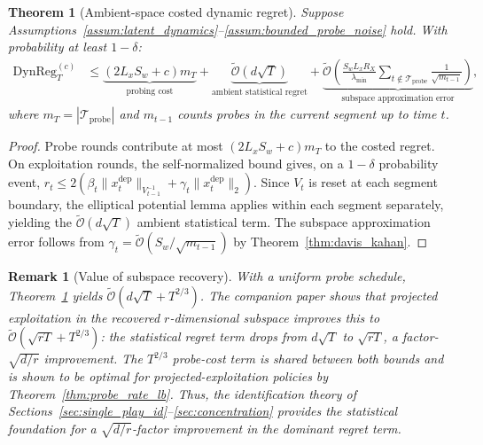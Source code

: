 \documentclass[12pt]{article}
\newcommand{\cTprobe}{\mathcal{T}_{\mathrm{probe}}}
\newcommand{\tilO}{\widetilde{\mathcal{O}}}
\newcommand{\DynReg}{\mathrm{DynReg}}
\newtheorem{theorem}{Theorem}
\newtheorem{remark}{Remark}
\theoremstyle{plain}
\theoremstyle{definition}
\begin{document}
\begin{theorem}[Ambient-space costed dynamic regret]
\label{thm:ambient_regret}
Suppose Assumptions~\ref{assum:latent_dynamics}--\ref{assum:bounded_probe_noise} hold. With probability at least $1 - \delta$:
\begin{align*}
\DynReg_T^{(c)} &\le \underbrace{(2L_x S_w + c) m_T}_{\text{probing cost}}
+ \underbrace{\tilO(d\sqrt{T})}_{\text{ambient statistical regret}}
+ \underbrace{\tilO\!\left(\frac{S_w L_x R_X}{\lambda_{\min}} \sum_{t \notin \cTprobe} \frac{1}{\sqrt{m_{t-1}}}\right)}_{\text{subspace approximation error}},
\end{align*}
where $m_T = |\cTprobe|$ and $m_{t-1}$ counts probes in the current segment up to time $t$.
\end{theorem}

\begin{proof}
Probe rounds contribute at most $(2L_x S_w + c) m_T$ to the costed regret. On exploitation rounds, the self-normalized bound gives, on a $1-\delta$ probability event, $r_t \le 2(\beta_t \|x_t^{\mathrm{dep}}\|_{V_{t-1}^{-1}} + \gamma_t \|x_t^{\mathrm{dep}}\|_2)$. Since $V_t$ is reset at each segment boundary, the elliptical potential lemma applies within each segment separately, yielding the $\tilO(d\sqrt{T})$ ambient statistical term. The subspace approximation error follows from $\gamma_t = \tilO(S_w/\sqrt{m_{t-1}})$ by Theorem~\ref{thm:davis_kahan}.
\end{proof}

\begin{remark}[Value of subspace recovery]
\label{rem:value_subspace}
With a uniform probe schedule, Theorem~\ref{thm:ambient_regret} yields $\tilO(d\sqrt{T} + T^{2/3})$. The companion paper shows that projected exploitation in the recovered $r$-dimensional subspace improves this to $\tilO(\sqrt{rT} + T^{2/3})$: the statistical regret term drops from $d\sqrt{T}$ to $\sqrt{rT}$, a factor-$\sqrt{d/r}$ improvement. The $T^{2/3}$ probe-cost term is shared between both bounds and is shown to be optimal for projected-exploitation policies by Theorem~\ref{thm:probe_rate_lb}. Thus, the identification theory of Sections~\ref{sec:single_play_id}--\ref{sec:concentration} provides the statistical foundation for a $\sqrt{d/r}$-factor improvement in the dominant regret term.
\end{remark}


\end{document}
